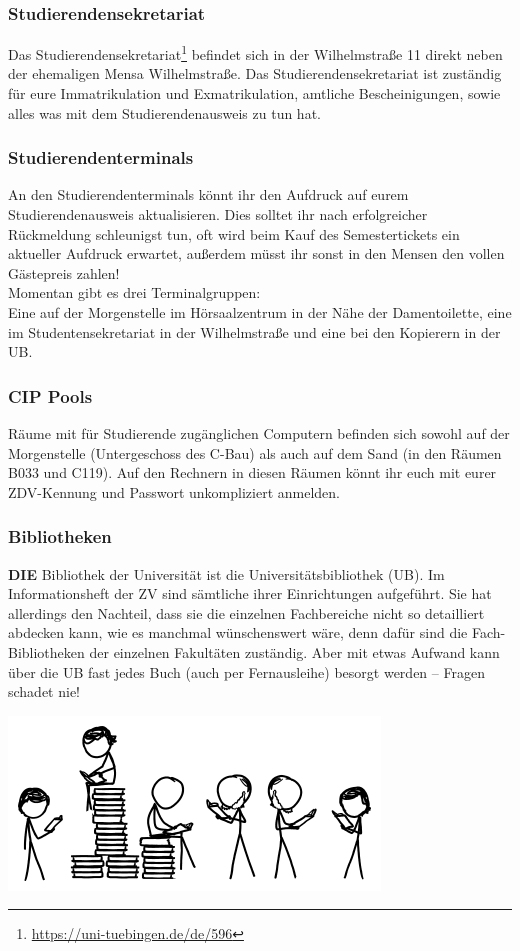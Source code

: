 \subsubsection*{Studierendensekretariat}
Das Studierendensekretariat\footnote{\url{https://uni-tuebingen.de/de/596}} befindet sich in der Wilhelmstraße 11 direkt neben der ehemaligen Mensa Wilhelmstraße. Das Studierendensekretariat ist zuständig für eure Immatrikulation und Exmatrikulation, amtliche Bescheinigungen, sowie alles was mit dem Studierendenausweis zu tun hat.	%

\subsubsection*{Studierendenterminals}
An den Studierendenterminals könnt ihr den Aufdruck auf eurem
Studierendenausweis aktualisieren. Dies solltet ihr nach erfolgreicher Rückmeldung schleunigst tun, oft wird beim Kauf des Semestertickets ein aktueller Aufdruck erwartet, außerdem müsst ihr sonst in den Mensen
den vollen Gästepreis zahlen!\\
Momentan gibt es drei Terminalgruppen:\\
Eine auf der Morgenstelle im Hörsaalzentrum in der Nähe der Damentoilette,
eine im Studentensekretariat in der Wilhelmstraße und eine bei den Kopierern in der UB.

\subsubsection*{CIP Pools}
Räume mit für Studierende zugänglichen Computern befinden sich sowohl auf der Morgenstelle (Untergeschoss des C-Bau) als auch auf dem Sand (in den Räumen B033 und C119). Auf den Rechnern in diesen Räumen könnt ihr euch mit eurer ZDV-Kennung und Passwort unkompliziert anmelden.

\subsubsection*{Bibliotheken}
\textbf{DIE} Bibliothek der Universität ist die
Universitätsbibliothek (UB).  Im Informationsheft der ZV sind
sämtliche ihrer Einrichtungen auf\-ge\-führt.  Sie hat
allerdings den Nachteil, dass sie die einzelnen Fachbereiche nicht so
detailliert abdecken kann, wie es manchmal wünschenswert wäre,
denn dafür sind die Fach-Bibliotheken der einzelnen Fakultäten
zuständig.  Aber mit etwas Aufwand kann über die UB fast jedes Buch
(auch per Fernausleihe) besorgt werden -- Fragen schadet nie!
\begin{center}
\includegraphics[width=0.45\hsize]{shared/xkcd/books_toomany.png}
\end{center}

